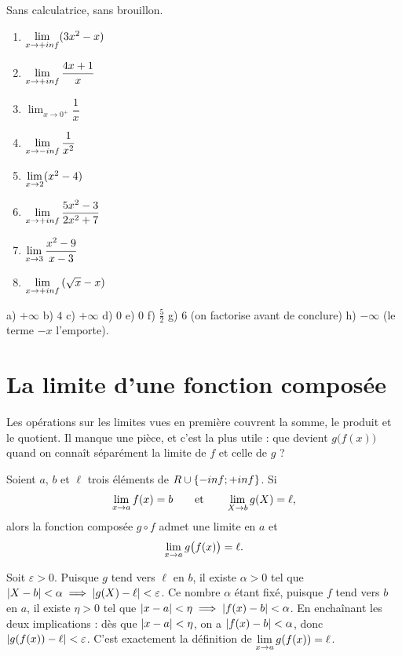 \begin{automatismes}
Sans calculatrice, sans brouillon.

\begin{enumerate}[label=\textbf{\alph*)}, leftmargin=*, itemsep=0.25em]
  \item $\limpinf (3x^{2}-x)$
  \item $\limpinf \dfrac{4x+1}{x}$
  \item $\displaystyle\lim_{x \to 0^{+}} \dfrac{1}{x}$
  \item $\limminf \dfrac{1}{x^{2}}$
  \item $\limx{2} (x^{2}-4)$
  \item $\limpinf \dfrac{5x^{2}-3}{2x^{2}+7}$
  \item $\limx{3} \dfrac{x^{2}-9}{x-3}$
  \item $\limpinf \left(\sqrt{x}-x\right)$
\end{enumerate}
\end{automatismes}

\begin{corrige}[automatismes]
a) $+\infty$ \quad b) $4$ \quad c) $+\infty$ \quad d) $0$ \quad e) $0$ \quad
f) $\tfrac{5}{2}$ \quad g) $6$ (on factorise avant de conclure) \quad
h) $-\infty$ (le terme $-x$ l'emporte).
\end{corrige}

\section{La limite d'une fonction composée}

Les opérations sur les limites vues en première couvrent la somme, le produit
et le quotient. Il manque une pièce, et c'est la plus utile : que devient
$g\bigl(f(x)\bigr)$ quand on connaît séparément la limite de $f$ et celle de
$g$ ?

\begin{theoreme}
Soient $a$, $b$ et $\ell$ trois éléments de $R \cup \{-inf ; +inf\}$.
Si
\[
  \limx{a} f(x) = b
  \qquad\text{et}\qquad
  \lim_{X \to b} g(X) = \ell,
\]
alors la fonction composée $g \circ f$ admet une limite en $a$ et
\[
  \limx{a} g\bigl(f(x)\bigr) = \ell .
\]
\end{theoreme}

\begin{demonstration}
Soit $\varepsilon > 0$. Puisque $g$ tend vers $\ell$ en $b$, il existe
$\alpha > 0$ tel que
$\left|X - b\right| < \alpha \implies \left|g(X) - \ell\right| < \varepsilon$.
Ce nombre $\alpha$ étant fixé, puisque $f$ tend vers $b$ en $a$, il existe
$\eta > 0$ tel que $\left|x - a\right| < \eta \implies \left|f(x) - b\right| < \alpha$.
En enchaînant les deux implications : dès que $\left|x-a\right| < \eta$, on a
$\left|f(x) - b\right| < \alpha$, donc $\left|g(f(x)) - \ell\right| < \varepsilon$.
C'est exactement la définition de $\limx{a} g(f(x)) = \ell$.
\end{demonstration}

